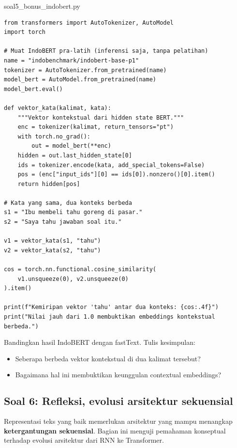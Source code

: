 \documentclass[12pt, a4paper]{article}
\begin{document}
\begin{codewindow}{soal5\_bonus\_indobert.py}
\begin{lstlisting}[style=pycode]
from transformers import AutoTokenizer, AutoModel
import torch

# Muat IndoBERT pra-latih (inferensi saja, tanpa pelatihan)
name = "indobenchmark/indobert-base-p1"
tokenizer = AutoTokenizer.from_pretrained(name)
model_bert = AutoModel.from_pretrained(name)
model_bert.eval()

def vektor_kata(kalimat, kata):
    """Vektor kontekstual dari hidden state BERT."""
    enc = tokenizer(kalimat, return_tensors="pt")
    with torch.no_grad():
        out = model_bert(**enc)
    hidden = out.last_hidden_state[0]
    ids = tokenizer.encode(kata, add_special_tokens=False)
    pos = (enc["input_ids"][0] == ids[0]).nonzero()[0].item()
    return hidden[pos]

# Kata yang sama, dua konteks berbeda
s1 = "Ibu membeli tahu goreng di pasar."
s2 = "Saya tahu jawaban soal itu."

v1 = vektor_kata(s1, "tahu")
v2 = vektor_kata(s2, "tahu")

cos = torch.nn.functional.cosine_similarity(
    v1.unsqueeze(0), v2.unsqueeze(0)
).item()

print(f"Kemiripan vektor 'tahu' antar dua konteks: {cos:.4f}")
print("Nilai jauh dari 1.0 membuktikan embeddings kontekstual berbeda.")
\end{lstlisting}
\end{codewindow}

Bandingkan hasil IndoBERT dengan fastText. Tulis kesimpulan:
\begin{itemize}
  \item Seberapa berbeda vektor kontekstual  di dua kalimat tersebut?
  \item Bagaimana hal ini membuktikan keunggulan contextual embeddings?
\end{itemize}

\clearpage
\subsection{Soal 6: Refleksi, evolusi arsitektur sekuensial}
\label{sec:soal6}

Representasi teks yang baik memerlukan arsitektur yang mampu menangkap \textbf{ketergantungan sekuensial}. Bagian ini menguji pemahaman konseptual terhadap evolusi arsitektur dari RNN ke Transformer.
\end{document}
